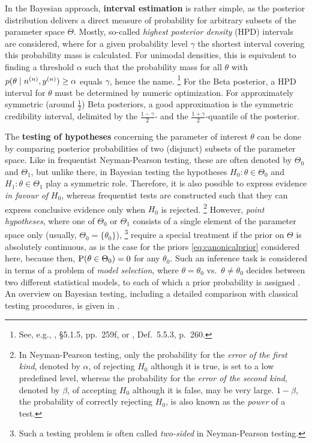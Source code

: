 In the Bayesian approach, \textbf{interval estimation} is rather simple,
as the posterior distribution delivers a direct measure of probability for arbitrary subsets of the parameter space $\Theta$.
Mostly, so-called \emph{highest posterior density} (HPD) intervals are considered,
where for a given probability level $\gamma$ the shortest interval covering this probability mass is calculated.
For unimodal densities, this is equivalent to finding a threshold $\alpha$ such that
the probability mass for all $\theta$ with $p(\theta\mid n^{(n)}, y^{(n)}) \ge \alpha$ equals $\gamma$, hence the name.%
\footnote{See, e.g., \textcite{2000:bernardosmith}, \S 5.1.5, pp.~259f, or \textcite{2007:robert}, Def.~5.5.3, p.~260.}
For the Beta posterior, a HPD interval for $\theta$ must be determined by numeric optimization.
For approximately symmetric (around $\frac{1}{2}$) Beta posteriors, a good approximation is the symmetric credibility interval,
delimited by the $\frac{1-\gamma}{2}$- and the $\frac{1+\gamma}{2}$-quantile of the posterior.

The \textbf{testing of hypotheses} concerning the parameter of interest $\theta$ can be done
by comparing posterior probabilities of two (disjunct) subsets of the parameter space.
Like in frequentist Neyman-Pearson testing, these are often denoted by $\Theta_0$ and $\Theta_1$,
but unlike there, in Bayesian testing the hypotheses $H_0: \theta \in \Theta_0$ and $H_1: \theta \in \Theta_1$ play a symmetric role.
Therefore, it is also possible to express evidence \emph{in favour of} $H_0$,
whereas frequentist tests are constructed such that they can express conclusive evidence only when $H_0$ is rejected.%
\footnote{In Neyman-Pearson testing, only the probability
for the \emph{error of the first kind}, denoted by $\alpha$, of rejecting $H_0$ although it is true, is set to a low predefined level,
whereas the probability for the \emph{error of the second kind}, denoted by $\beta$, of accepting $H_0$ although it is false, may be very large.
$1-\beta$, the probability of correctly rejecting $H_0$, is also known as the \emph{power} of a test.}
However, \emph{point hypotheses}, where one of $\Theta_0$ or $\Theta_1$
consists of a single element of the parameter space only (usually, $\Theta_0 = \{\theta_0\}$),%
\footnote{Such a testing problem is often called \emph{two-sided} in Neyman-Pearson testing.}
require a special treatment if the prior on $\Theta$ is absolutely continuous,
as is the case for the priors \eqref{eq:canonicalprior} considered here,
because then, $\operatorname{P}(\theta \in \Theta_0) = 0$ for any $\theta_0$.
Such an inference task is considered in terms of a problem of \emph{model selection},
where $\theta = \theta_0$ vs.\ $\theta \neq \theta_0$ decides between two different statistical models,
to each of which a prior probability is assigned \parencite[\S 5.2.4]{2007:robert}.
An overview on Bayesian testing, including a detailed comparison with classical testing procedures,
is given in \textcite[\S 5.2--5.4]{2007:robert}.

